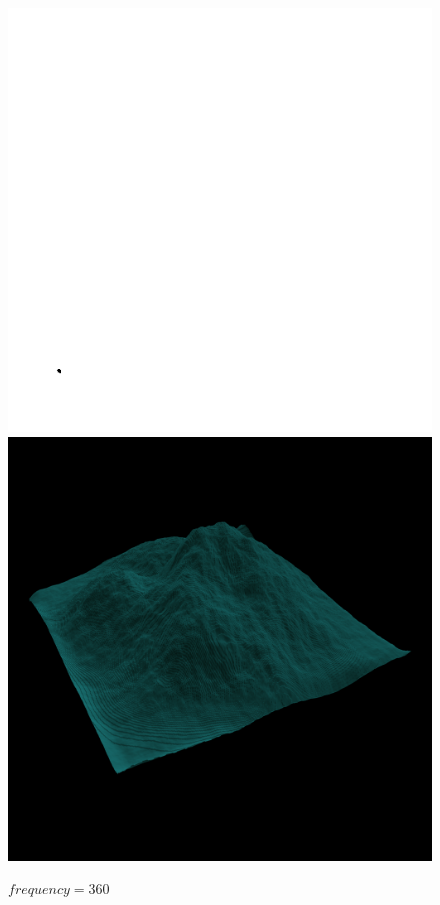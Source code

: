    		\begin{figure}[H]
   			\centering
   			\includegraphics[width=\imagewidth]{images/results/terrains/512-1/perlin/360}
   			\includegraphics[width=\imagewidth]{images/results/terrains/512-1/perlin/360_3d}
  			\caption{$frequency = 360$}
   			\label{fig:ex-perlin360-surface}
   		\end{figure}
   		
